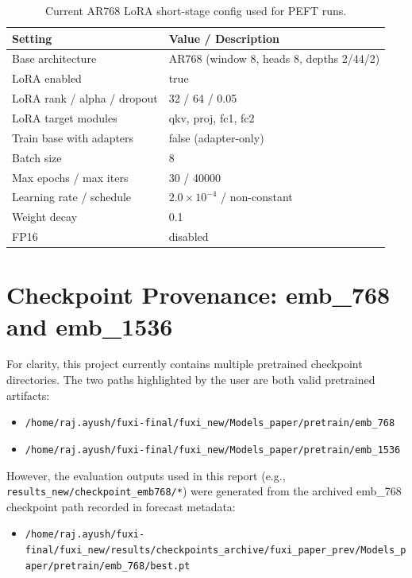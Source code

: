 \documentclass[12pt]{report}
\begin{document}
\begin{table}[H]
\centering
\caption{Current AR768 LoRA short-stage config used for PEFT runs.}
\begin{tabular}{ll}
\hline
\textbf{Setting} & \textbf{Value / Description} \\
\hline
Base architecture & AR768 (window 8, heads 8, depths 2/44/2) \\
LoRA enabled & true \\
LoRA rank / alpha / dropout & 32 / 64 / 0.05 \\
LoRA target modules & qkv, proj, fc1, fc2 \\
Train base with adapters & false (adapter-only) \\
Batch size & 8 \\
Max epochs / max iters & 30 / 40000 \\
Learning rate / schedule & $2.0\times10^{-4}$ / non-constant \\
Weight decay & 0.1 \\
FP16 & disabled \\
\hline
\end{tabular}
\end{table}

\section{Checkpoint Provenance: emb\_768 and emb\_1536}

For clarity, this project currently contains multiple pretrained checkpoint directories. The two paths highlighted by the user are both valid pretrained artifacts:

\begin{itemize}
  \item \texttt{/home/raj.ayush/fuxi-final/fuxi\_new/Models\_paper/pretrain/emb\_768}
  \item \texttt{/home/raj.ayush/fuxi-final/fuxi\_new/Models\_paper/pretrain/emb\_1536}
\end{itemize}

However, the evaluation outputs used in this report (e.g., \texttt{results\_new/checkpoint\_emb768/*}) were generated from the archived emb\_768 checkpoint path recorded in forecast metadata:

\begin{itemize}
  \item \texttt{/home/raj.ayush/fuxi-final/fuxi\_new/results/checkpoints\_archive/fuxi\_paper\_prev/Models\_paper/pretrain/emb\_768/best.pt}
\end{itemize}
\end{document}
